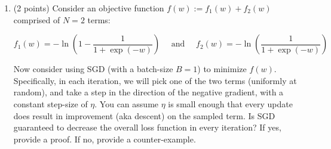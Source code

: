 \documentclass[11pt,english]{article}
\begin{document}
\begin{enumerate}[start]
%
%
%
%
\item (2 points)
Consider an objective function $f(w) := f_1(w) + f_2(w)$ comprised of $N=2$ terms:


\begin{equation}
  f_1(w) = -\ln \left( 1 - \frac{1}{1 + \exp(-w)} \right) \quad \text{ and } \quad
  f_2(w) = - \ln \left( \frac{1}{1 + \exp(-w)} \right)
\end{equation}

Now consider using SGD (with a batch-size $B=1$) to minimize $f(w)$. Specifically, in each iteration,
we will pick one of the two terms (uniformly at random), and take a step in the direction of the negative gradient, with a constant
step-size of $\eta$.
You can assume $\eta$ is small enough that every update does result in improvement (aka descent) on the sampled term.
Is SGD guaranteed to decrease the overall loss function in every iteration? If yes, provide a proof. If no, provide a counter-example.

\end{enumerate}
\end{document}
